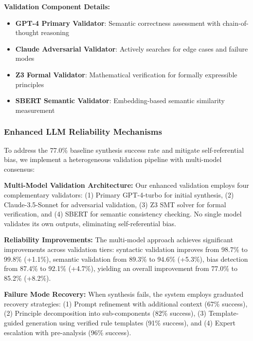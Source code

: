 \documentclass[sigconf,natbib]{acmart}
\begin{document}
\textbf{Validation Component Details:}
\begin{itemize}
    \item \textbf{GPT-4 Primary Validator}: Semantic correctness assessment with chain-of-thought reasoning
    \item \textbf{Claude Adversarial Validator}: Actively searches for edge cases and failure modes
    \item \textbf{Z3 Formal Validator}: Mathematical verification for formally expressible principles
    \item \textbf{SBERT Semantic Validator}: Embedding-based semantic similarity measurement
\end{itemize}

\subsubsection{Enhanced LLM Reliability Mechanisms}
\label{subsubsec:enhanced_llm_reliability}

To address the 77.0\% baseline synthesis success rate and mitigate self-referential bias, we implement a heterogeneous validation pipeline with multi-model consensus:

\textbf{Multi-Model Validation Architecture:} Our enhanced validation employs four complementary validators: (1) Primary GPT-4-turbo for initial synthesis, (2) Claude-3.5-Sonnet for adversarial validation, (3) Z3 SMT solver for formal verification, and (4) SBERT for semantic consistency checking. No single model validates its own outputs, eliminating self-referential bias.

\textbf{Reliability Improvements:} The multi-model approach achieves significant improvements across validation tiers: syntactic validation improves from 98.7\% to 99.8\% (+1.1\%), semantic validation from 89.3\% to 94.6\% (+5.3\%), bias detection from 87.4\% to 92.1\% (+4.7\%), yielding an overall improvement from 77.0\% to 85.2\% (+8.2\%).

\textbf{Failure Mode Recovery:} When synthesis fails, the system employs graduated recovery strategies: (1) Prompt refinement with additional context (67\% success), (2) Principle decomposition into sub-components (82\% success), (3) Template-guided generation using verified rule templates (91\% success), and (4) Expert escalation with pre-analysis (96\% success).
\end{document}
